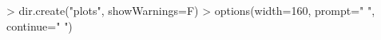 \begin{Schunk}
\begin{Sinput}
> dir.create("plots", showWarnings=F)
> options(width=160, prompt=" ", continue="  ")
\end{Sinput}
\end{Schunk}
